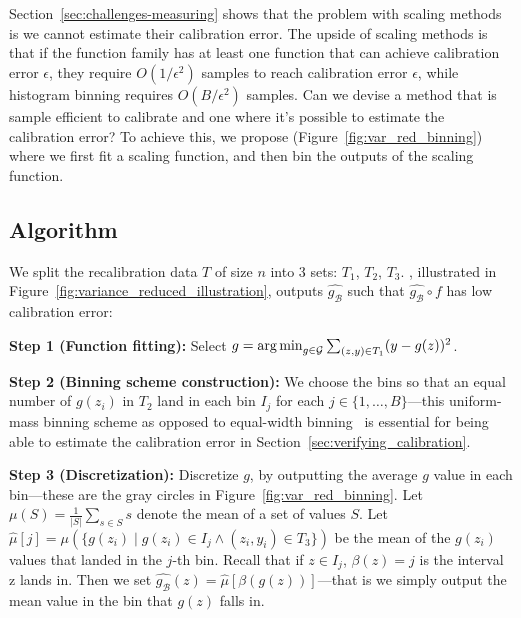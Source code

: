 \section{\Ourcal{}}
\label{sec:calibrating_models}

Section~\ref{sec:challenges-measuring} shows that the problem with scaling methods is we cannot estimate their calibration error. The upside of scaling methods is that if the function family has at least one function that can achieve calibration error $\epsilon$, they require $O(1/\epsilon^2)$ samples to reach calibration error $\epsilon$, while histogram binning requires $O(B/\epsilon^2)$ samples. Can we devise a method that is sample efficient to calibrate and one where it's possible to estimate the calibration error?
To achieve this, we propose \ourcal{} (Figure~\ref{fig:var_red_binning}) where we first fit a scaling function, and then bin the outputs of the scaling function.

\subsection{Algorithm}

We split the recalibration data $T$ of size $n$ into 3 sets: $T_1$, $T_2$, $T_3$. \Ourcal{}, illustrated in Figure~\ref{fig:variance_reduced_illustration}, outputs $\hat{g_{\mathcal{B}}}$ such that $\hat{g_{\mathcal{B}}} \circ f$ has low calibration error:

\textbf{Step 1 (Function fitting):} Select $g = \operatorname*{arg\,min}_{g \in \mathcal{G}} \sum_{(z, y) \in T_1} (y - g(z))^2$.

\textbf{Step 2 (Binning scheme construction):} We choose the bins so that an equal number of $g(z_i)$ in $T_2$ land in each bin $I_j$ for each $j \in \{1, \dots, B\}$---this uniform-mass binning scheme as opposed to equal-width binning~\cite{guo2017calibration} is essential for being able to estimate the calibration error in Section~\ref{sec:verifying_calibration}.

\textbf{Step 3 (Discretization):} Discretize $g$, by outputting the average $g$ value in each bin---these are the gray circles in Figure~\ref{fig:var_red_binning}. Let $\mu(S) = \frac{1}{|S|} \sum_{s \in S} s$ denote the mean of a set of values $S$.
Let $\hat{\mu}[j] = \mu(\{ g(z_i) \; | \; g(z_i) \in I_j \wedge (z_i, y_i) \in T_3 \})$ be the mean of the $g(z_i)$ values that landed in the $j$-th bin.
Recall that if $z \in I_j$,  $\beta(z) = j$ is the interval z lands in.
Then we set $\hat{g_{\mathcal{B}}}(z) = \hat{\mu}[\beta(g(z))]$---that is we simply output the mean value in the bin that $g(z)$ falls in.

